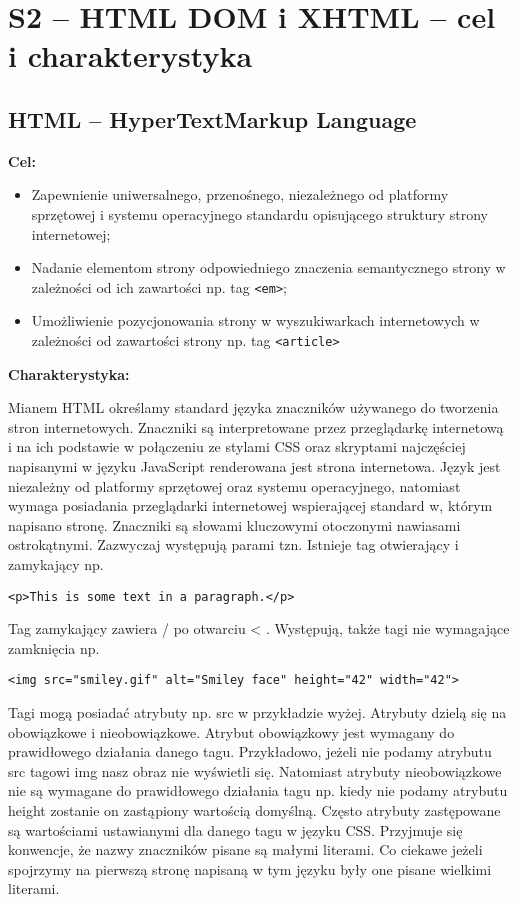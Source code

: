 \section{S2 -- HTML DOM i XHTML -- cel i charakterystyka}

\subsection{HTML -- HyperTextMarkup Language}

\textbf{Cel:}
\begin{itemize}
\item Zapewnienie uniwersalnego, przenośnego, niezależnego od platformy sprzętowej i systemu operacyjnego standardu opisującego struktury strony internetowej;
\item Nadanie elementom strony odpowiedniego znaczenia semantycznego strony w zależności od ich zawartości np. tag \texttt{<em>};
\item Umożliwienie pozycjonowania strony w wyszukiwarkach internetowych w zależności od zawartości strony np. tag \texttt{<article>}
\end{itemize}

\textbf{Charakterystyka:}

Mianem HTML określamy standard języka znaczników używanego do tworzenia stron internetowych. Znaczniki są interpretowane przez przeglądarkę internetową i na ich podstawie w połączeniu ze stylami CSS oraz skryptami najczęściej napisanymi w języku JavaScript renderowana jest strona internetowa. Język jest niezależny od platformy sprzętowej oraz systemu operacyjnego, natomiast wymaga posiadania przeglądarki internetowej wspierającej standard w, którym napisano stronę. Znaczniki są słowami kluczowymi otoczonymi nawiasami ostrokątnymi. Zazwyczaj występują parami tzn. Istnieje tag otwierający i zamykający np.

\begin{verbatim}<p>This is some text in a paragraph.</p>\end{verbatim}

Tag zamykający zawiera / po otwarciu < . Występują, także tagi nie wymagające zamknięcia np. 

\begin{verbatim}<img src="smiley.gif" alt="Smiley face" height="42" width="42">\end{verbatim}

Tagi mogą posiadać atrybuty np. src w przykładzie wyżej. Atrybuty dzielą się na obowiązkowe i nieobowiązkowe. Atrybut obowiązkowy jest wymagany do prawidłowego działania danego tagu. Przykładowo, jeżeli nie podamy atrybutu src tagowi img nasz obraz nie wyświetli się. Natomiast atrybuty nieobowiązkowe nie są wymagane do prawidłowego działania tagu np. kiedy nie podamy atrybutu height zostanie on zastąpiony wartością domyślną. Często atrybuty zastępowane są wartościami ustawianymi dla danego tagu w języku CSS. Przyjmuje się konwencje, że nazwy znaczników pisane są małymi literami. Co ciekawe jeżeli spojrzymy na pierwszą stronę napisaną w tym języku były one pisane wielkimi literami.


